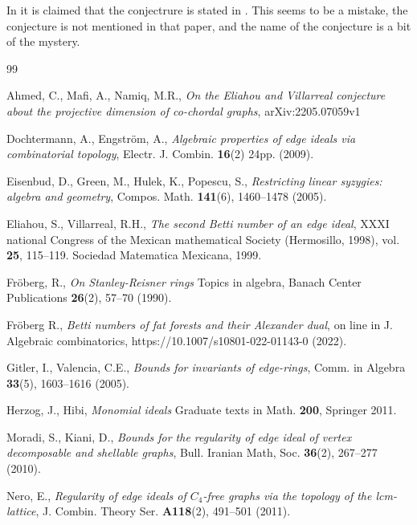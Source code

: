 \documentclass[11pt, oneside]{article}   	%
\begin{document}
\begin{rmk}
In \cite{a-m-n} it is claimed that the conjectrure is stated in \cite{e-v}. This seems to be a mistake, the conjecture is not mentioned in that paper, and the name of the
conjecture is a bit of the mystery.
\end{rmk}


\begin{thebibliography}{99}

 Ahmed, C., Mafi, A., Namiq, M.R., {\it On the Eliahou and Villarreal conjecture about the projective dimension of co-chordal graphs},
arXiv:2205.07059v1

 Dochtermann, A., Engstr\"om, A., {\it Algebraic properties of edge ideals via combinatorial topology}, Electr. J. Combin. {\bf 16}(2) 24pp. (2009).

 Eisenbud, D., Green, M., Hulek, K., Popescu, S., {\it Restricting linear syzygies: algebra and geometry}, Compos. Math. {\bf 141}(6), 1460--1478 (2005).

 Eliahou, S., Villarreal, R.H.,  {\it The second Betti number of an edge ideal}, XXXI national Congress of the Mexican mathematical Society (Hermosillo, 1998),
vol. {\bf 25}, 115--119. Sociedad Matematica Mexicana, 1999.

 Fr\"oberg, R., {\it On Stanley-Reisner rings} Topics in algebra, Banach Center Publications {\bf 26}(2), 57--70 (1990).

 Fr\"oberg R., {\it Betti numbers of fat forests and their Alexander dual}, on line in J. Algebraic combinatorics, https://10.1007/s10801-022-01143-0 (2022).

 Gitler, I., Valencia, C.E., {\it Bounds for invariants of edge-rings}, Comm. in Algebra {\bf 33}(5), 1603--1616 (2005).

 Herzog, J., Hibi, {\it Monomial ideals} Graduate texts in Math. {\bf 200}, Springer 2011.

 Moradi, S., Kiani, D., {\it Bounds for the regularity of edge ideal of vertex decomposable and shellable graphs}, Bull. Iranian Math, Soc. {\bf 36}(2),
267--277 (2010).

 Nero, E., {\it Regularity of edge ideals of $C_4$-free graphs via the topology of the lcm-lattice}, J. Combin. Theory Ser. {\bf A118}(2), 491--501 (2011).
\end{thebibliography}
\end{document}
